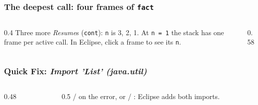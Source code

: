 \documentclass[aspectratio=169,10pt,compress]{beamer}
\begin{document}
\begin{frame}[t,fragile] \frametitle{The deepest call: four frames of \texttt{fact}}
  \begin{columns}[T]
    \begin{column}{0.4\textwidth}
      \small Three more \emph{Resume}s (\texttt{cont}): \texttt{n} is 3, 2, 1. At \texttt{n = 1} the stack has one
      frame per active call. In Eclipse, click a frame to see its \texttt{n}.
    \end{column}
    \begin{column}{0.58\textwidth}
    \end{column}
  \end{columns}
\end{frame}





\begin{frame}[t,fragile] \frametitle{Quick Fix: \emph{Import 'List' (java.util)}}
  \begin{columns}[T]
    \begin{column}{0.48\textwidth}
    \end{column}
    \begin{column}{0.5\textwidth}
      \small {} /  on the error, or  / : Eclipse adds both imports.
    \end{column}
  \end{columns}
\end{frame}
\end{document}
